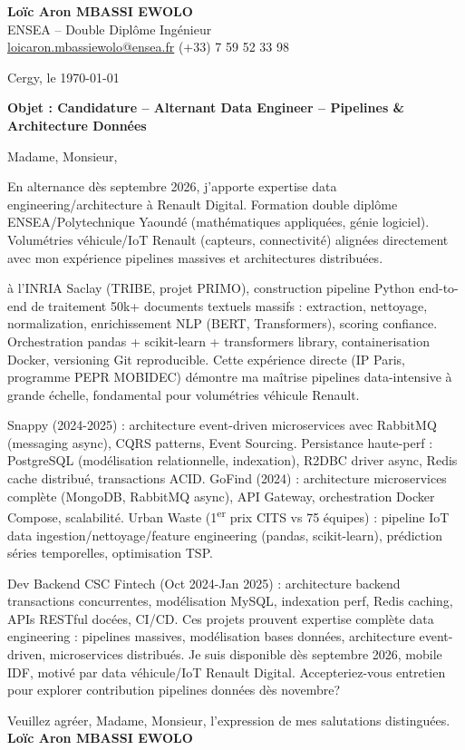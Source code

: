 \documentclass[a4paper,11pt]{article}
\begin{document}
\noindent \textbf{Lo\"ic Aron MBASSI EWOLO} \\
ENSEA -- Double Dipl\^ome Ing\'enieur \\
\href{mailto:loicaron.mbassiewolo@ensea.fr}{loicaron.mbassiewolo@ensea.fr} \quad (+33) 7 59 52 33 98

\vspace{1em}
\noindent Cergy, le \today

\vspace{1em}
\noindent \textbf{Objet : Candidature -- Alternant Data Engineer -- Pipelines \& Architecture Donn\'ees}

\vspace{1.5em}
\noindent Madame, Monsieur,

\vspace{0.8em}
\noindent En alternance d\`es septembre 2026, j'apporte expertise data engineering/architecture \`a Renault Digital. Formation double dipl\^ome ENSEA/Polytechnique Yaound\'e (math\'ematiques appliqu\'ees, g\'enie logiciel). Volum\'etries v\'ehicule/IoT Renault (capteurs, connectivit\'e) alignées directement avec mon exp\'erience pipelines massives et architectures distribuées.

\vspace{0.8em}
\noindent \`a l'INRIA Saclay (TRIBE, projet PRIMO), construction pipeline Python end-to-end de traitement 50k+ documents textuels massifs : extraction, nettoyage, normalization, enrichissement NLP (BERT, Transformers), scoring confiance. Orchestration pandas + scikit-learn + transformers library, containerisation Docker, versioning Git reproducible. Cette exp\'erience directe (IP Paris, programme PEPR MOBIDEC) d\'emontre ma ma\^itrise pipelines data-intensive \`a grande \'echelle, fondamental pour volum\'etries v\'ehicule Renault.

\vspace{0.8em}
\noindent Snappy (2024-2025) : architecture event-driven microservices avec RabbitMQ (messaging async), CQRS patterns, Event Sourcing. Persistance haute-perf : PostgreSQL (mod\'elisation relationnelle, indexation), R2DBC driver async, Redis cache distribu\'e, transactions ACID. GoFind (2024) : architecture microservices complète (MongoDB, RabbitMQ async), API Gateway, orchestration Docker Compose, scalabilit\'e. Urban Waste (1\textsuperscript{er} prix CITS vs 75 \'equipes) : pipeline IoT data ingestion/nettoyage/feature engineering (pandas, scikit-learn), pr\'ediction s\'eries temporelles, optimisation TSP.

\vspace{0.8em}
\noindent Dev Backend CSC Fintech (Oct 2024-Jan 2025) : architecture backend transactions concurrentes, mod\'elisation MySQL, indexation perf, Redis caching, APIs RESTful doc\'ees, CI/CD. Ces projets prouvent expertise complète data engineering : pipelines massives, mod\'elisation bases données, architecture event-driven, microservices distribu\'es. Je suis disponible d\`es septembre 2026, mobile IDF, motiv\'e par data v\'ehicule/IoT Renault Digital. Accepteriez-vous entretien pour explorer contribution pipelines donn\'ees d\`es novembre?

\vspace{1.5em}
\noindent Veuillez agr\'eer, Madame, Monsieur, l'expression de mes salutations distingu\'ees.
\vspace{2em}
\noindent \textbf{Lo\"ic Aron MBASSI EWOLO}
\end{document}
